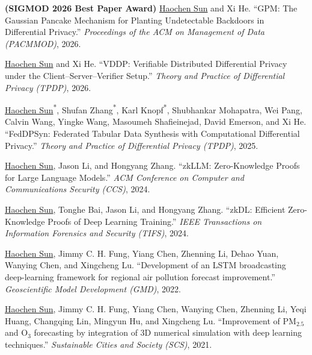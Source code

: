 
\newcommand{\cofa}{\textsuperscript{*}}

\begin{cventries2}
\begin{cvenumerate}
    \item \textbf{(SIGMOD 2026 Best Paper Award)} \underline{Haochen Sun} and Xi He. ``GPM: The Gaussian Pancake Mechanism for Planting Undetectable Backdoors in Differential Privacy.'' \textit{Proceedings of the ACM on Management of Data (PACMMOD)}, 2026.
    \item \underline{Haochen Sun} and Xi He. ``VDDP: Verifiable Distributed Differential Privacy under the Client--Server--Verifier Setup.'' \textit{Theory and Practice of Differential Privacy (TPDP)}, 2026.
    \item \underline{Haochen Sun}\cofa, Shufan Zhang\cofa, Karl Knopf\cofa, Shubhankar Mohapatra, Wei Pang, Calvin Wang, Yingke Wang, Masoumeh Shafieinejad, David Emerson, and Xi He. ``FedDPSyn: Federated Tabular Data Synthesis with Computational Differential Privacy.'' \textit{Theory and Practice of Differential Privacy (TPDP)}, 2025.
    \item \underline{Haochen Sun}, Jason Li, and Hongyang Zhang. ``zkLLM: Zero-Knowledge Proofs for Large Language Models.'' \textit{ACM Conference on Computer and Communications Security (CCS)}, 2024.
    \item \underline{Haochen Sun}, Tonghe Bai, Jason Li, and Hongyang Zhang. ``zkDL: Efficient Zero-Knowledge Proofs of Deep Learning Training.'' \textit{IEEE Transactions on Information Forensics and Security (TIFS)}, 2024.
    \item \underline{Haochen Sun}, Jimmy C. H. Fung, Yiang Chen, Zhenning Li, Dehao Yuan, Wanying Chen, and Xingcheng Lu. ``Development of an LSTM broadcasting deep-learning framework for regional air pollution forecast improvement.'' \textit{Geoscientific Model Development (GMD)}, 2022.
    \item \underline{Haochen Sun}, Jimmy C. H. Fung, Yiang Chen, Wanying Chen, Zhenning Li, Yeqi Huang, Changqing Lin, Mingyun Hu, and Xingcheng Lu. ``Improvement of $\text{PM}_{2.5}$ and $\text{O}_{3}$ forecasting by integration of 3D numerical simulation with deep learning techniques.'' \textit{Sustainable Cities and Society (SCS)}, 2021.
\end{cvenumerate}
\end{cventries2}
